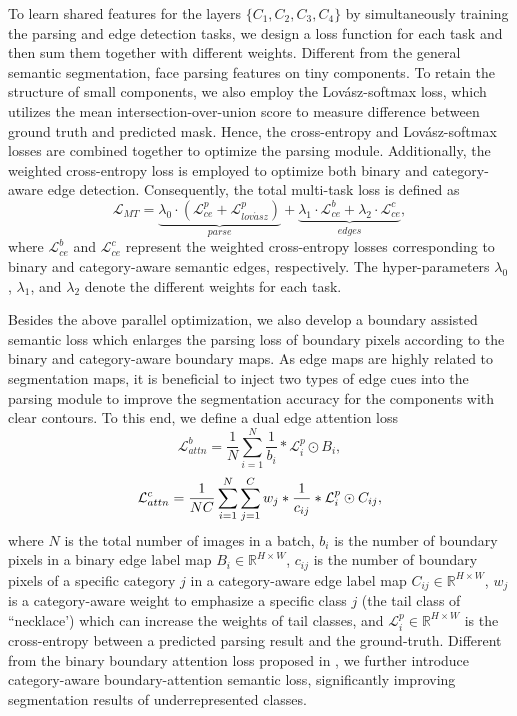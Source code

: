 \documentclass[10pt,twocolumn,letterpaper]{article}
\begin{document}
To learn shared features for the layers $\{C_1, C_2, C_3, C_4\}$ by simultaneously training the parsing and edge detection tasks, we design a loss function for each task and then sum them together with different weights. Different from the general semantic segmentation, face parsing features on tiny components. To retain the structure of small components, we also employ the Lov{\'a}sz-softmax \cite{lovasz} loss, which utilizes the mean intersection-over-union score to measure difference between ground truth and predicted mask. Hence, the cross-entropy \cite{bce} and Lov{\'a}sz-softmax \cite{lovasz} losses are combined together to optimize the parsing module. Additionally, the weighted cross-entropy \cite{bce} loss is employed to optimize both binary and category-aware edge detection. Consequently, the total multi-task loss is defined as
\small
\begin{equation}
\mathcal{L}_{MT} = \underbrace{\lambda_{0} \cdot (\mathcal{L}^p_{ce} + \mathcal{L}^p_{lov\acute{a}sz})}_{parse} +  \underbrace{\lambda_{1} \cdot \mathcal{L}^{b}_{ce} + \lambda_{2} \cdot \mathcal{L}^{c}_{ce}}_{edges},
\end{equation} 
where $\mathcal{L}^{b}_{ce}$ and $\mathcal{L}^{c}_{ce}$ represent the weighted cross-entropy losses \cite{bce} corresponding to binary and category-aware semantic edges, respectively. The hyper-parameters $\lambda_{0}$, $\lambda_{1}$, and $\lambda_{2}$ denote the different weights for each task.

Besides the above parallel optimization, we also develop a boundary assisted semantic loss which enlarges the parsing loss of boundary pixels according to the binary and category-aware boundary maps. As edge maps are highly related to segmentation maps, it is beneficial to inject two types of edge cues into the parsing module to improve the segmentation accuracy for the components with clear contours. 
To this end, we define a dual edge attention loss
\small
\begin{equation}
\mathcal{L}_{attn}^{b} = \frac{1}{N}\sum_{i=1}^{N} \frac{1}{b_i} * \mathcal{L}_{i}^{p} \odot B_i,
\end{equation}
\begin{equation}
\small
\mathcal{L}_{attn}^{c} = \frac{1}{NC}\sum_{i=1}^{N} \sum_{j=1}^{C}  w_j* \frac{1}{c_{ij}}* \mathcal{L}_{i}^{p} \odot C_{ij},
\label{eq:dal}
\end{equation}
\normalsize
where $N$ is the total number of images in a batch, $b_i$ is the number of boundary pixels in a binary edge label map $B_i \in \mathbb{R}^{H \times W}$, $c_{ij}$ is the number of boundary pixels of a specific category $j$ in a category-aware edge label map $C_{ij} \in \mathbb{R}^{H \times W}$, $w_j$ is a category-aware weight to emphasize a  specific class $j$ (\eg the tail class of ``necklace') which can increase the weights of tail classes, and $\mathcal{L}_{i}^{p} \in \mathbb{R}^{H \times W} $ is the cross-entropy between a predicted parsing result and the ground-truth. Different from the binary boundary attention loss proposed in \cite{lapa}, we further introduce category-aware boundary-attention semantic loss, significantly improving segmentation results of underrepresented classes.
\end{document}
